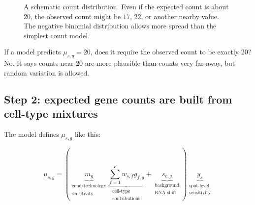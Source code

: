 \documentclass[11pt]{article}
\begin{document}
\begin{figure}[H]
\centering
{}
\caption{A schematic count distribution. Even if the expected count is about $20$, the observed count might be $17$, $22$, or another nearby value. The negative binomial distribution allows more spread than the simplest count model.}
\end{figure}

\begin{checkpoint}
If a model predicts $\mu_{s,g}=20$, does it require the observed count to be exactly $20$? No. It says counts near 20 are more plausible than counts very far away, but random variation is allowed.
\end{checkpoint}

\newpage
\subsection{Step 2: expected gene counts are built from cell-type mixtures}

The model defines $\mu_{s,g}$ like this:

\begin{mathbox}
\[
\boxed{
\mu_{s,g}
=
\left(
\underbrace{m_g}_{\substack{\text{gene/technology}\\\text{sensitivity}}}
\underbrace{\sum_{f=1}^{F} w_{s,f}g_{f,g}}_{\substack{\text{cell-type}\\\text{contributions}}}
+
\underbrace{s_{e,g}}_{\substack{\text{background}\\\text{RNA shift}}}
\right)
\underbrace{y_s}_{\substack{\text{spot-level}\\\text{sensitivity}}}
}
\]
\end{mathbox}
\end{document}
